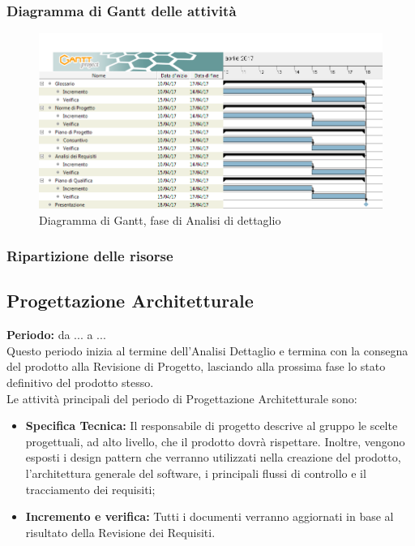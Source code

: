 	\subsubsection{Diagramma di Gantt delle attività}
	\begin{figure}[H]
		\centering
		\includegraphics[scale=0.30]{immagini/gantt/consolidamento_requisiti.png}
		\caption{Diagramma di Gantt, fase di Analisi di dettaglio}
	\end{figure}
	\subsubsection{Ripartizione delle risorse}
	\subsection{Progettazione Architetturale}
	\textbf{Periodo:} da ... a ... \\
	Questo periodo inizia al termine dell'Analisi Dettaglio e termina con la consegna del prodotto alla Revisione di Progetto, lasciando alla prossima fase lo stato definitivo del prodotto stesso. \\
	Le attività principali del periodo di Progettazione Architetturale sono: \\
	\begin{itemize}
		\item \textbf{Specifica Tecnica:} Il responsabile di progetto descrive al gruppo le scelte progettuali, ad alto livello, che il prodotto dovrà rispettare. Inoltre, vengono esposti i design pattern che verranno utilizzati nella creazione del prodotto, l'architettura generale del software, i principali flussi di controllo e il tracciamento dei requisiti; \\
		\item \textbf{Incremento e verifica:} Tutti i documenti verranno aggiornati in base al risultato
della Revisione dei Requisiti. \\
	\end{itemize}
